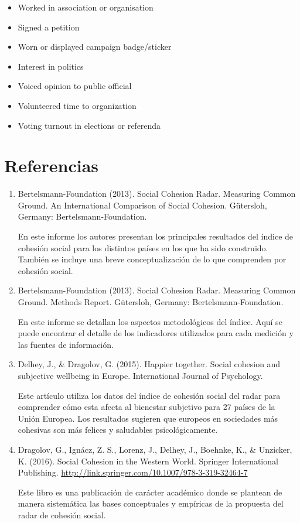 \documentclass[
  12pt,
]{book}
\providecommand{\tightlist}{%
  \setlength{\itemsep}{0pt}\setlength{\parskip}{0pt}}
\begin{document}
\begin{itemize}
\tightlist
\item
  Worked in association or organisation
\item
  Signed a petition
\item
  Worn or displayed campaign badge/sticker
\item
  Interest in politics
\item
  Voiced opinion to public official
\item
  Volunteered time to organization
\item
  Voting turnout in elections or referenda
\end{itemize}

\hypertarget{referencias-2}{%
\section{Referencias}\label{referencias-2}}

\begin{enumerate}
\def\labelenumi{\arabic{enumi}.}
\item
  Bertelsmann-Foundation (2013). Social Cohesion Radar. Measuring
  Common Ground. An International Comparison of Social Cohesion.
  Gütersloh, Germany: Bertelsmann-Foundation.

  En este informe los autores presentan los principales resultados del índice de cohesión social para los distintos países en los que ha sido construido. También se incluye una breve conceptualización de lo que comprenden por cohesión social.
\item
  Bertelsmann-Foundation (2013). Social Cohesion Radar. Measuring
  Common Ground. Methods Report. Gütersloh, Germany:
  Bertelsmann-Foundation.

  En este informe se detallan los aspectos metodológicos del índice. Aquí se puede encontrar el detalle de los indicadores utilizados para cada medición y las fuentes de información.
\item
  Delhey, J., \& Dragolov, G. (2015). Happier together. Social cohesion
  and subjective wellbeing in Europe. International Journal of Psychology.

  Este artículo utiliza los datos del índice de cohesión social del radar para comprender cómo esta afecta al bienestar subjetivo para 27 países de la Unión Europea. Los resultados sugieren que europeos en sociedades más cohesivas son más felices y saludables psicológicamente.
\item
  Dragolov, G., Ignácz, Z. S., Lorenz, J., Delhey, J., Boehnke, K., \& Unzicker, K. (2016). Social Cohesion in the Western World. Springer International Publishing. \url{http://link.springer.com/10.1007/978-3-319-32464-7}

  Este libro es una publicación de carácter académico donde se plantean de manera sistemática las bases conceptuales y empíricas de la propuesta del radar de cohesión social.
\end{enumerate}
\end{document}
